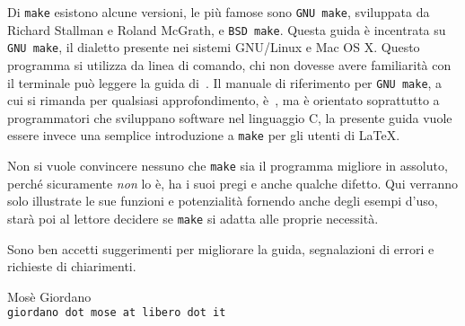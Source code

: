 Di \texttt{make} esistono alcune versioni, le più famose sono \texttt{GNU make},
sviluppata da Richard Stallman e Roland McGrath, e \texttt{BSD make}.  Questa
guida è incentrata su \texttt{GNU make}, il dialetto presente nei sistemi
GNU/Linux e Mac OS X.  Questo programma si utilizza da linea di comando, chi non
dovesse avere familiarità con il terminale può leggere la guida
di~\cite{giacomelli:console}.  Il manuale di riferimento per \texttt{GNU make},
a cui si rimanda per qualsiasi approfondimento, è~\cite{gnu:make}, ma è
orientato soprattutto a programmatori che sviluppano software nel linguaggio C,
la presente guida vuole essere invece una semplice introduzione a \texttt{make}
per gli utenti di \LaTeX{}.

Non si vuole convincere nessuno che \texttt{make} sia il programma migliore in
assoluto, perché sicuramente \emph{non} lo è, ha i suoi pregi e anche qualche
difetto.  Qui verranno solo illustrate le sue funzioni e potenzialità fornendo
anche degli esempi d'uso, starà poi al lettore decidere se \texttt{make} si
adatta alle proprie necessità.

Sono ben accetti suggerimenti per migliorare la guida, segnalazioni di errori e
richieste di chiarimenti.

\begin{flushright}
\begin{minipage}{0.6\textwidth}\centering
Mosè Giordano \\
\texttt{giordano dot mose at libero dot it}
\end{minipage}
\end{flushright}

